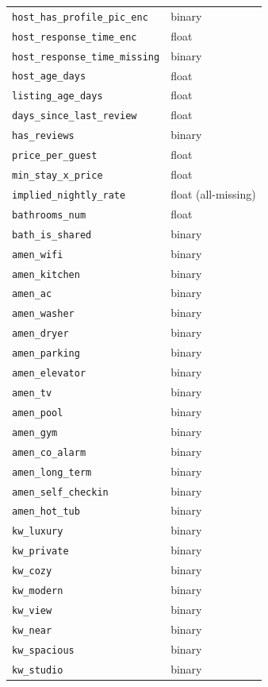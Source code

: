 \documentclass[journal]{IEEEtran}
\begin{document}
\begin{longtable}{p{2.2in}p{0.8in}}
\texttt{host\_has\_profile\_pic\_enc} & binary \\
\texttt{host\_response\_time\_enc} & float \\
\texttt{host\_response\_time\_missing} & binary \\
\texttt{host\_age\_days} & float \\
\texttt{listing\_age\_days} & float \\
\texttt{days\_since\_last\_review} & float \\
\texttt{has\_reviews} & binary \\
\texttt{price\_per\_guest} & float \\
\texttt{min\_stay\_x\_price} & float \\
\texttt{implied\_nightly\_rate} & float (all-missing) \\
\texttt{bathrooms\_num} & float \\
\texttt{bath\_is\_shared} & binary \\
\texttt{amen\_wifi} & binary \\
\texttt{amen\_kitchen} & binary \\
\texttt{amen\_ac} & binary \\
\texttt{amen\_washer} & binary \\
\texttt{amen\_dryer} & binary \\
\texttt{amen\_parking} & binary \\
\texttt{amen\_elevator} & binary \\
\texttt{amen\_tv} & binary \\
\texttt{amen\_pool} & binary \\
\texttt{amen\_gym} & binary \\
\texttt{amen\_co\_alarm} & binary \\
\texttt{amen\_long\_term} & binary \\
\texttt{amen\_self\_checkin} & binary \\
\texttt{amen\_hot\_tub} & binary \\
\texttt{kw\_luxury} & binary \\
\texttt{kw\_private} & binary \\
\texttt{kw\_cozy} & binary \\
\texttt{kw\_modern} & binary \\
\texttt{kw\_view} & binary \\
\texttt{kw\_near} & binary \\
\texttt{kw\_spacious} & binary \\
\texttt{kw\_studio} & binary \\

\end{longtable}
\end{document}
